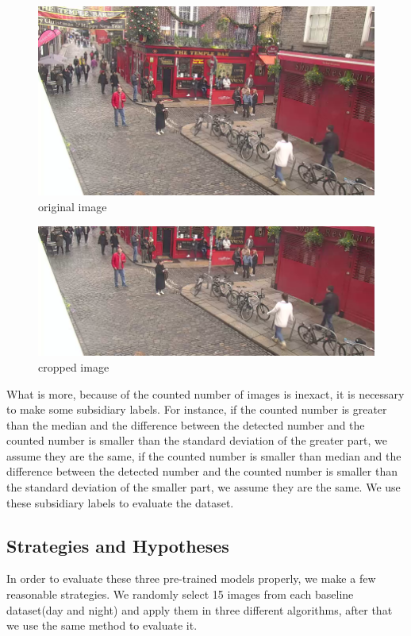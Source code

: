 \documentclass[runningheads]{llncs}
\begin{document}
\begin{figure}[H]
	\includegraphics[width=\textwidth]{figs/eva_original_img.png}
	\caption{original image} \label{fig12}
\end{figure}
\begin{figure}
	\includegraphics[width=\textwidth]{figs/eva_cropped_img.png}
	\caption{cropped image} \label{fig13}
\end{figure}


What is more, because of the counted number of images is inexact, it is necessary to make some subsidiary labels. For instance, if the counted number is greater than the median and the difference between the detected number and the counted number is smaller than the standard deviation of the greater part, we assume they are the same, if the counted number is smaller than median and the difference between the detected number and the counted number is smaller than the standard deviation of the smaller part, we assume they are the same. We use these subsidiary labels to evaluate the dataset. 


\subsection{Strategies and Hypotheses}
In order to evaluate these three pre-trained models properly, we make a few reasonable strategies. We randomly select 15 images from each baseline dataset(day and night) and apply them in three different algorithms, after that we use the same method to evaluate it.
\end{document}
